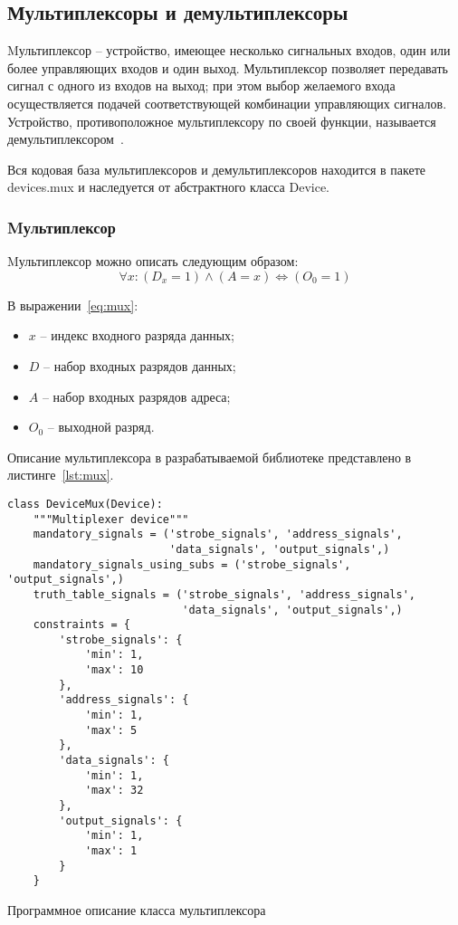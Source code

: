 \documentclass[document.tex]{subfiles}
\begin{document}
\clearpage

\subsection{Мультиплексоры и демультиплексоры}
Mультиплексор -- устройство, имеющее несколько сигнальных входов, один или более
управляющих входов и один выход. Мультиплексор позволяет передавать сигнал с
одного из входов на выход; при этом выбор желаемого входа осуществляется подачей
соответствующей комбинации управляющих сигналов. Устройство, противоположное
мультиплексору по своей функции, называется демультиплексором~\cite{wikimux}.

Вся кодовая база мультиплексоров и демультиплексоров находится в пакете
devices.mux и наследуется от абстрактного класса Device. 

\clearpage
\subsubsection{Mультиплексор}

Mультиплексор можно описать следующим образом:
\begin{equation}
\label{eq:mux}
\forall x: (D_x = 1) \wedge (A = x) \Leftrightarrow (O_0 = 1)
\end{equation}

В выражении~\ref{eq:mux}:
\begin{itemize}[noitemsep]
  \item $x$ -- индекс входного разряда данных;
  \item $D$ -- набор входных разрядов данных;
  \item $A$ -- набор входных разрядов адреса;
  \item $O_0$ -- выходной разряд.
\end{itemize}

Описание мультиплексора в разрабатываемой библиотеке представлено в
листинге~\ref{lst:mux}.

\begin{listing}[ht]
\begin{verbatim}
class DeviceMux(Device):
    """Multiplexer device"""
    mandatory_signals = ('strobe_signals', 'address_signals',
                         'data_signals', 'output_signals',)
    mandatory_signals_using_subs = ('strobe_signals', 'output_signals',)
    truth_table_signals = ('strobe_signals', 'address_signals',
                           'data_signals', 'output_signals',)
    constraints = {
        'strobe_signals': {
            'min': 1,
            'max': 10
        },
        'address_signals': {
            'min': 1,
            'max': 5
        },
        'data_signals': {
            'min': 1,
            'max': 32
        },
        'output_signals': {
            'min': 1,
            'max': 1
        }
    }
\end{verbatim}
\caption{Программное описание класса мультиплексора}
\label{lst:mux}
\end{listing}
\end{document}
